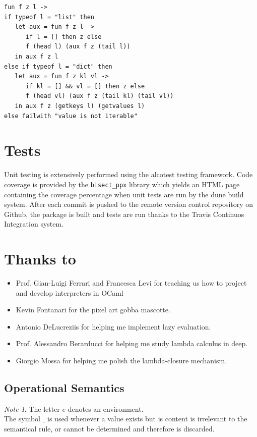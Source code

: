 \documentclass[a4paper, 10pt]{article}
\theoremstyle{plain}%
\theoremstyle{definition}
\theoremstyle{remark}
\newtheorem*{note}{Note}
\begin{document}
\begin{multicols}{2}
\begin{lstlisting}[style=caml,caption=The right fold procedure]
fun f z l ->
if typeof l = "list" then
   let aux = fun f z l ->
	  if l = [] then z else
	  f (head l) (aux f z (tail l))
   in aux f z l
else if typeof l = "dict" then
   let aux = fun f z kl vl ->
	  if kl = [] && vl = [] then z else
	  f (head vl) (aux f z (tail kl) (tail vl))
   in aux f z (getkeys l) (getvalues l)
else failwith "value is not iterable"
\end{lstlisting}


\section{Tests}
Unit testing is extensively performed using the alcotest testing framework. Code
coverage is provided by the \texttt{bisect\_ppx} library which yields an HTML
page containing the coverage percentage when unit tests are run by the dune
build system. After each commit is pushed to the remote version control repository on
Github, the package is built and tests are run thanks to the Travis Continuos
Integration system.

\section{Thanks to}

\begin{itemize}
	\item Prof. Gian-Luigi Ferrari and Francesca Levi for teaching us how to project and develop
	interpreters in OCaml
	\item Kevin Fontanari for the pixel art gobba mascotte.
	\item Antonio DeLucreziis for helping me implement lazy evaluation.
	\item Prof. Alessandro Berarducci for helping me study lambda calculus in deep.
	\item Giorgio Mossa for helping me polish the lambda-closure mechanism.
\end{itemize}

\end{multicols}

\iffalse
\subsection{Operational Semantics}

\begin{note}
	The letter $e$ denotes an environment. \\
	The symbol $\_$ is used whenever a value exists but is content is irrelevant
	to the semantical rule, or cannot be determined and therefore is discarded.
\end{note}
\end{document}
